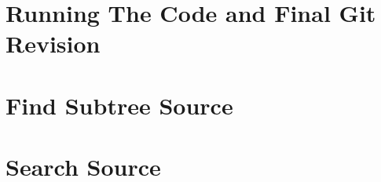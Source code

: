 \appendix
\label{sec:Appendix}
\chapter{Running The Code and Final Git Revision}

\chapter{Find Subtree Source}
\label{sec:findSubtree}

\chapter{Search Source}
\label{sec:SearchSource}

